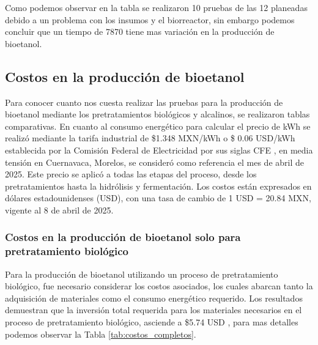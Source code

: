 \documentclass[12pt]{article}
\begin{document}
		
 Como podemos observar en la tabla se realizaron 10 pruebas de las 12 planeadas debido a un problema con los insumos y el biorreactor, sin embargo podemos concluir que un tiempo de 7870 tiene mas variación en la producción de bioetanol.
				
		
		
		
		
			
			\subsection{Costos en la producción de bioetanol}
	Para conocer cuanto nos cuesta realizar las pruebas para la producción de bioetanol mediante los pretratamientos biológicos y alcalinos, se realizaron tablas comparativas.
	En cuanto al consumo energético para calcular el precio de kWh se realizó mediante la tarifa industrial de \$1.348 MXN/kWh o \$ 0.06 USD/kWh establecida por la Comisión Federal de Electricidad por sus siglas CFE  \cite{CFE2023}, en media tensión en Cuernavaca, Morelos, se consideró como referencia el mes de abril de 2025. Este precio se aplicó a todas las etapas del proceso, desde los pretratamientos hasta la hidrólisis y fermentación. Los costos están expresados en dólares estadounidenses (USD), con una tasa de cambio de 1 USD = 20.84 MXN, vigente al 8 de abril de 2025.
			
		
	 \subsubsection{Costos en la producción de bioetanol solo para pretratamiento biológico}
			
			
Para la producción de bioetanol utilizando un proceso de pretratamiento biológico, fue necesario considerar los costos asociados, los cuales abarcan tanto la adquisición de materiales como el consumo energético requerido. Los resultados demuestran que la inversión total requerida para los materiales necesarios en el proceso de pretratamiento biológico, asciende a \$5.74 USD , para mas detalles podemos observar la Tabla 	\ref{tab:costos_completos}.
\end{document}
